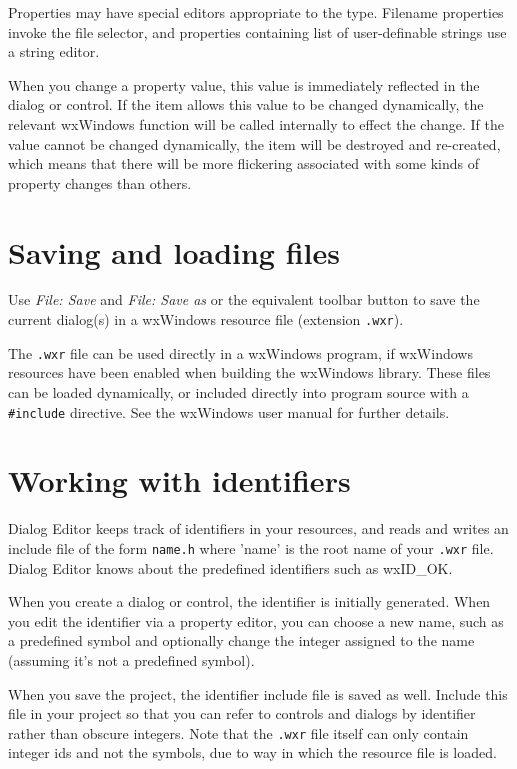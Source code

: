 Properties may have special editors appropriate to the type. Filename properties invoke
the file selector, and properties containing list of user-definable strings use a
string editor.

When you change a property value, this value is immediately reflected in
the dialog or control.  If the item allows this value to be changed
dynamically, the relevant wxWindows function will be called internally
to effect the change.  If the value cannot be changed dynamically, the
item will be destroyed and re-created, which means that there will be
more flickering associated with some kinds of property changes than
others.

\section{Saving and loading files}

Use {\it File: Save} and {\it File: Save as} or the equivalent toolbar button
to save the current dialog(s) in a wxWindows resource file (extension {\tt .wxr}).

The {\tt .wxr} file can be used directly in a wxWindows program, if
wxWindows resources have been enabled when building the wxWindows library.
These files can be loaded dynamically, or included directly into program source
with a \verb$#include$ directive. See the wxWindows user manual for further details.

\section{Working with identifiers}

Dialog Editor keeps track of identifiers in your resources, and reads and writes an include file of the
form {\tt name.h} where 'name' is the root name of your {\tt .wxr} file. Dialog Editor
knows about the predefined identifiers such as wxID\_OK.

When you create a dialog or control, the identifier is initially generated. When you
edit the identifier via a property editor, you can choose a new name, such as a predefined
symbol and optionally change the integer assigned to the name (assuming it's not a
predefined symbol).

When you save the project, the identifier include file is saved as well. Include this file
in your project so that you can refer to controls and dialogs by identifier rather than
obscure integers. Note that the {\tt .wxr} file itself can only contain integer ids and not the symbols,
due to way in which the resource file is loaded.

